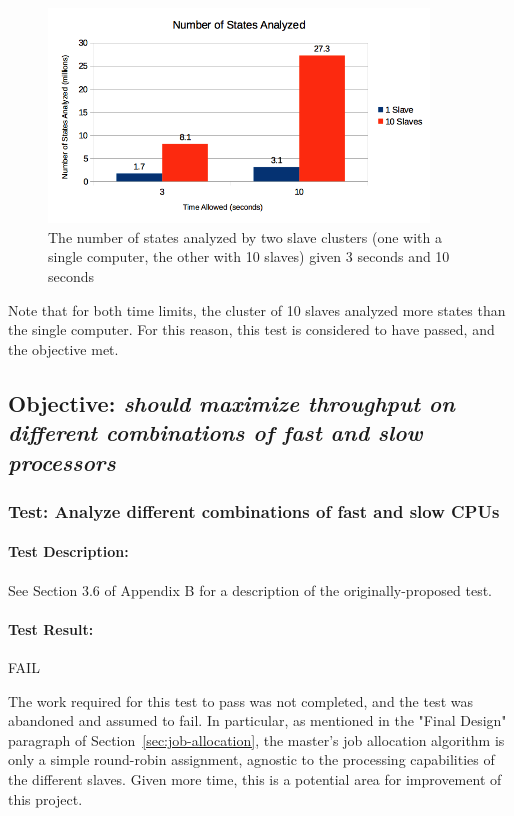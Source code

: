 \documentclass[pdftex,12pt,a4paper]{article}
\begin{document}
\begin{figure}[h]
\begin{center}
\includegraphics[width=0.9\textwidth]{img/number-analyzed}
\caption{The number of states analyzed by two slave clusters (one with a single computer, the other with 10 slaves) given 3 seconds and 10 seconds}
\label{fig:number-analyzed}
\end{center}
\end{figure}

Note that for both time limits, the cluster of 10 slaves analyzed more states than the single computer. For this reason, this test is considered to have passed, and the objective met. 

\subsection{\textbf{Objective:} \emph{should maximize throughput on different combinations of fast and slow processors}}

\subsubsection{\textbf{Test:} Analyze different combinations of fast and slow CPUs}

\paragraph{Test Description:} See Section 3.6 of Appendix B for a description of the originally-proposed test.

\paragraph{Test Result:} FAIL

The work required for this test to pass was not completed, and the test was abandoned and assumed to fail. In particular, as mentioned in the "Final Design" paragraph of Section~\ref{sec:job-allocation}, the master's job allocation algorithm is only a simple round-robin assignment, agnostic to the processing capabilities of the different slaves. Given more time, this is a potential area for improvement of this project.
\end{document}
